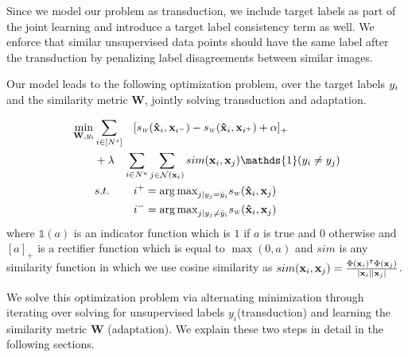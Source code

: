 Since we model our problem as transduction, we include target labels as part of the joint learning and introduce a target label consistency term as well. We enforce that similar unsupervised data points should have the same label after the transduction by penalizing label disagreements between similar images.

Our model leads to the following optimization problem, over the target labels $y_i$ and the similarity metric $\mathbf{W}$, jointly solving transduction and adaptation. 
 
 
\begin{equation}
\begin{aligned}
\min_{\mathbf{W}, y_i} &\sum_{i \in [N^s]} &&[\sw(\xsi,\mathbf{x}_{i^-}) - \sw(\xsi,\mathbf{x}_{i^+}) + \alpha]_{+}  \\
&+\lambda &&\hspace{-3mm}\sum_{i \in N^u} \sum_{j \in \mathcal{N}(\xui)}  sim(\xui, \xuj) \mathds{1}(y_i \neq y_j)\\
&s.t. \quad &&i^{+} = {\arg\max}_{j | y_j = \hat{y}_i} \sw(\mathbf{\hat{x}}_i,\mathbf{x}_{j}) \\
&\quad &&i^{-} = {\arg\max}_{j | y_j \neq \hat{y}_i} \sw(\mathbf{\hat{x}}_i,\mathbf{x}_{j}) 
\end{aligned}
\label{loss}
\end{equation}
where $\mathds{1}(a)$ is an indicator function which is $1$ if $a$ is true and $0$ otherwise and $[a]_+$ is a rectifier function which is equal to $\max(0, a)$ and $sim$ is any similarity function in which we use cosine similarity as $sim(\mathbf{x}_i, \mathbf{x}_j)= \frac{\Phi(\mathbf{x}_i)^\intercal \Phi(\mathbf{x}_j)}{|\mathbf{x}_i||\mathbf{x}_j|}$. 

We solve this optimization problem via alternating minimization through iterating over solving for unsupervised labels $y_i$(transduction) and learning the similarity metric $\mathbf{W}$ (adaptation). We explain these two steps in detail in the following sections.

 


